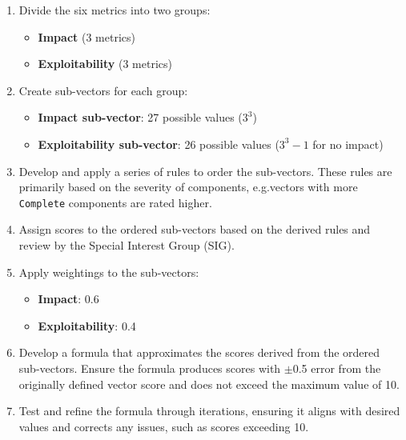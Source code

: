 \documentclass[12pt]{article}
\begin{document}
\begin{enumerate}
	\item  Divide the six metrics into two groups:

	      \begin{itemize}
		      \item \textbf{Impact} (3 metrics)
		      \item \textbf{Exploitability} (3 metrics)
	      \end{itemize}

	\item Create sub-vectors for each group:
	      \begin{itemize}
		      \item \textbf{Impact sub-vector}: 27 possible values ($3^3$)
		      \item \textbf{Exploitability sub-vector}: 26 possible values ($3^3 - 1$ for no impact)
	      \end{itemize}

	\item Develop and apply a series of rules to order the sub-vectors. These rules
	      are primarily based on the severity of components, e.g.\@ vectors with more
	      \texttt{Complete}
	      components are rated higher.

	\item Assign scores to the ordered sub-vectors based on the derived rules and review by the
	      Special Interest Group (SIG).

	\item Apply weightings to the sub-vectors:
	      \begin{itemize}
		      \item \textbf{Impact}: 0.6
		      \item \textbf{Exploitability}: 0.4
	      \end{itemize}

	\item \label{formula} Develop a formula that approximates the scores derived from the ordered
	      sub-vectors. Ensure the formula produces scores with $\pm$0.5 error from the originally
	      defined vector score and does not exceed the maximum value of 10.

	\item Test and refine the formula through iterations, ensuring it aligns with desired values and
	      corrects any issues, such as scores exceeding 10.

\end{enumerate}
\end{document}
